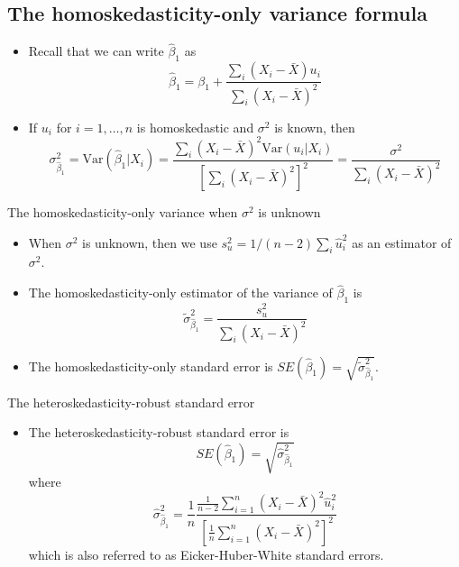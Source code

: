\documentclass[presentation]{beamer}
\begin{document}
\subsection*{The homoskedasticity-only variance formula}
\label{sec:org01f5553}

\begin{itemize}
\item Recall that we can write \(\hat{\beta}_1\) as
\begin{equation*}
\hat{\beta}_1 = \beta_1 + \frac{\sum_i (X_i - \bar{X})u_i}{\sum_i
(X_i - \bar{X})^2}
\end{equation*}

\item If \(u_i\) for \(i=1, \ldots, n\) is homoskedastic and \(\sigma^2\) is
known, then
\begin{equation}
\label{eq:vbeta-1a} 
\sigma^2_{\hat{\beta}_1} = \mathrm{Var}(\hat{\beta}_1 | X_i) = \frac{\sum_i (X_i -
\bar{X})^2 \mathrm{Var}(u_i|X_i)}{\left[\sum_i (X_i - \bar{X})^2\right]^2} =
\frac{\sigma^2}{\sum_i (X_i - \bar{X})^2}
\end{equation}
\end{itemize}

\begin{frame}[label={sec:org97cf9ab}]{The homoskedasticity-only variance when \(\sigma^2\) is unknown}
\begin{itemize}
\item When \(\sigma^2\) is unknown, then we use \(s^2_u = 1/(n-2) \sum_i
  \hat{u}_i^2\) as an estimator of \(\sigma^2\).

\item The homoskedasticity-only estimator of the variance of \(\hat{\beta}_1\) is
\begin{equation}
\label{eq:vbeta-1b} \tilde{\sigma}^2_{\hat{\beta}_1} =
\frac{s^2_u}{\sum_i (X_i - \bar{X})^2}
\end{equation}

\item The homoskedasticity-only standard error is \(SE(\hat{\beta}_1) =
  \sqrt{\tilde{\sigma}^2_{\hat{\beta}_1}}\).
\end{itemize}
\end{frame}

\begin{frame}[label={sec:org4abe2e8}]{The heteroskedasticity-robust standard error}
\begin{itemize}
\item The heteroskedasticity-robust standard error is
\begin{equation*}
SE(\hat{\beta}_1) = \sqrt{\hat{\sigma}^2_{\hat{\beta}_1}}
\end{equation*}
where
\begin{equation*}
\hat{\sigma}^2_{\hat{\beta}_1} = \frac{1}{n} \frac{\frac{1}{n-2}
\sum_{i=1}^n (X_i - \bar{X})^2 \hat{u}^2_i}{\left[ \frac{1}{n}
\sum_{i=1}^n (X_i - \bar{X})^2 \right]^2}
\end{equation*}
which is also referred to as Eicker-Huber-White standard errors.
\end{itemize}
\end{frame}
\end{document}
